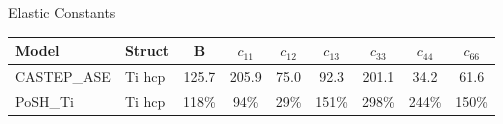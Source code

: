 \documentclass[preview]{standalone}
\begin{document}
\begin{center}
\textnormal{Elastic Constants} \\
\vspace{2mm}
\begin{tabular}{ l l c c c c c c c } \toprule 
Model & Struct & B & $c_{11}$ & $c_{12}$ & $c_{13}$ & $c_{33}$ & $c_{44}$ & $c_{66}$\\ \midrule 
CASTEP\_ASE & Ti hcp & 125.7 & 205.9 & 75.0 & 92.3 & 201.1 & 34.2 & 61.6\\ 
PoSH\_Ti & Ti hcp & 118\% & 94\% & 29\% & 151\% & 298\% & 244\% & 150\%\\ 
\end{tabular} \bigskip 
\end{center}
\end{document}
